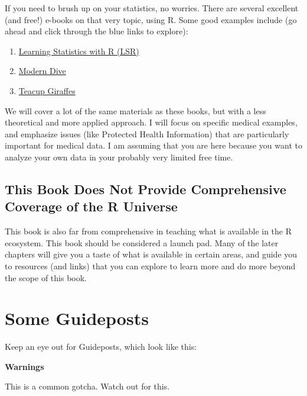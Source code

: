 \documentclass[
]{book}
\providecommand{\tightlist}{%
  \setlength{\itemsep}{0pt}\setlength{\parskip}{0pt}}
\begin{document}
If you need to brush up on your statistics, no worries. There are several excellent (and free!) e-books on that very topic, using R. Some good examples include (go ahead and click through the blue links to explore):

\begin{enumerate}
\def\labelenumi{\arabic{enumi}.}
\tightlist
\item
  \href{https://learningstatisticswithr-bookdown.netlify.com}{Learning Statistics with R (LSR)}
\item
  \href{https://bookdown.org/fjmcgrade/ismaykim/}{Modern Dive}
\item
  \href{https://tinystats.github.io/teacups-giraffes-and-statistics/index.html}{Teacup Giraffes}
\end{enumerate}

We will cover a lot of the same materials as these books, but with a less theoretical and more applied approach. I will focus on specific medical examples, and emphasize issues (like Protected Health Information) that are particularly important for medical data. I am assuming that you are here because you want to analyze your own data in your probably very limited free time.

\hypertarget{this-book-does-not-provide-comprehensive-coverage-of-the-r-universe}{%
\subsection{This Book Does Not Provide Comprehensive Coverage of the R Universe}\label{this-book-does-not-provide-comprehensive-coverage-of-the-r-universe}}

This book is also far from comprehensive in teaching what is available in the R ecosystem. This book should be considered a launch pad. Many of the later chapters will give you a taste of what is available in certain areas, and guide you to resources (and links) that you can explore to learn more and do more beyond the scope of this book.

\hypertarget{some-guideposts}{%
\section{Some Guideposts}\label{some-guideposts}}

Keep an eye out for Guideposts, which look like this:

\textbf{Warnings}

This is a common gotcha. Watch out for this.
\end{document}
